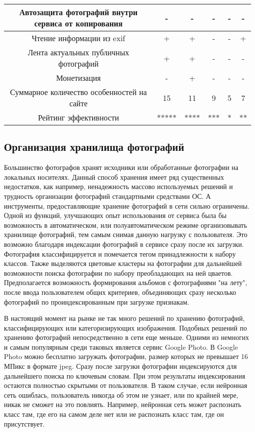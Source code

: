 \begin{table}[H]
\begin{tabular}{|c|c|c|c|c|c|}
  \hline Автозащита фотографий внутри сервиса от копирования & - & - & - & - & - \\ 
  \hline Чтение информации из exif & + & + & - & - & + \\ 
  \hline Лента актуальных публичных фотографий & + & + & - & - & - \\ 
  \hline Монетизация & - & + & - & - & - \\ 
  \hline Суммарное количество особенностей на сайте & 15 & 11 & 9 & 5 & 7 \\ 
  \hline Рейтинг эффективности & ***** & **** & *** & * & ** \\
  \hline
  \end{tabular}
\end{table}

\subsection{Организация хранилища фотографий}

Большинство фотографов хранят исходники или обработанные фотографии на локальных носителях.
Данный способ хранения имеет ряд существенных недостатков, как например, ненадежность массово используемых решений и трудность организации фотографий стандартными средствами ОС.
А инструменты, предоставляющие хранение фотографий в сети сильно ограничены.
Одной из функций, улучшающих опыт использования от сервиса была бы возможность в автоматическом, или полуавтоматическом режиме организовывать хранилище фотографий, тем самым снимая данную нагрузку с пользователя.
Это возможно благодаря индексации фотографий в сервисе сразу после их загрузки. 
Фотография классифицируется и помечается тегом принадлежности к набору классов.
Также выделяются цветовые кластеры на фотографии для дальнейшей возможности поиска фотографии по набору преобладающих на ней цваетов.
Предполагается возможность формирования альбомов с фотографиями "на лету", после ввода пользователем общих критериев, объединяющих сразу несколько фотографий по проиндексированным при загрузке признакам.


В настоящий момент на рынке не так много решений по хранению фотографий, классифицирующих или категоризирующих изображения.
Подобных решений по хранению фотографий непосредственно в сети еще меньше.
Одними из немногих и самым популярным среди таковых является сервис Google Photo. 
В Google Photo можно бесплатно загружать фотографии, размер которых не превышает 16 МПикс в формате jpeg. 
Сразу после загрузки фотографии индексируются для дальнейшего поиска по ключевым словам.
При этом результаты индексирования остаются полностью скрытыми от пользователя. 
В таком случае, если нейронная сеть ошиблась, пользователь никогда об этом не узнает, или по крайней мере, никак не сможет на это повлиять. 
Например, нейронная сеть может распознать класс там, где его на самом деле нет или не распознать класс там, где он присутствует.

